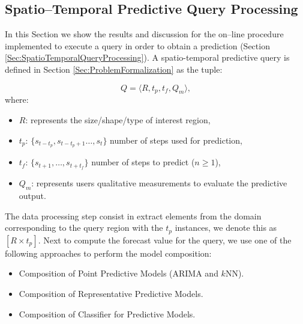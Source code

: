 
\subsection{Spatio--Temporal Predictive Query Processing}

In this Section we show the results and discussion for the on--line procedure implemented to execute a query in order to obtain a prediction (Section \ref{Sec:SpatioTemporalQueryProcessing}). A spatio-temporal predictive query is defined in Section \ref{Sec:ProblemFormalization}  as the tuple:

\begin{equation*} 
Q = \langle R, t_{p}, t_{f}, Q_{m} \rangle,
\end{equation*}
where:
\begin{itemize}[noitemsep,nolistsep]	
	\item $R$: represents the size/shape/type of interest region,
	\item $t_{p}$: $\{s_{t-t_p}, s_{t-t_{p}+1}\ldots, s_{t}\}$ number of steps used for  prediction,
	\item $t_{f}$: $\{s_{t+1}, \ldots, s_{t+t_f}\}$ number of steps to predict ($n\geq 1$),
	\item $Q_{m}$: represents users qualitative measurements to evaluate the predictive output.
\end{itemize}

The data processing step consist in extract elements from the domain corresponding to the query region with the $t_p$ instances, we denote this as $[R \times t_{p}]$. Next to compute the forecast value for the query, we use one of the following approaches to perform the model composition:

\begin{itemize}
	\item Composition of Point Predictive Models (ARIMA and $k$NN).
	\item Composition of Representative Predictive Models.
	\item Composition of Classifier for Predictive Models.	
\end{itemize}

